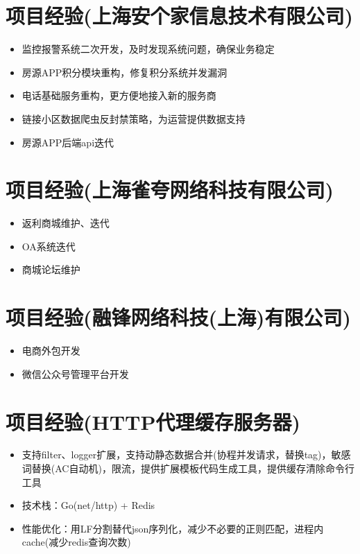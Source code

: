 \documentclass[a4paper,12pt]{article}
\begin{document}
\begin{CJK}{UTF8}{gbsn}
		\section{项目经验(上海安个家信息技术有限公司)}
			\begin{itemize}
				\item{监控报警系统二次开发，及时发现系统问题，确保业务稳定}
				\item{房源APP积分模块重构，修复积分系统并发漏洞}
				\item{电话基础服务重构，更方便地接入新的服务商}
				\item{链接小区数据爬虫反封禁策略，为运营提供数据支持}
				\item{房源APP后端api迭代}
			\end{itemize}
		
		\section{项目经验(上海雀夸网络科技有限公司)}
			\begin{itemize}
				\item{返利商城维护、迭代}
				\item{OA系统迭代}
				\item{商城论坛维护}
			\end{itemize}
			
		\section{项目经验(融锋网络科技(上海)有限公司)}
			\begin{itemize}
				\item{电商外包开发}
				\item{微信公众号管理平台开发}
			\end{itemize}
			
		\section{项目经验(HTTP代理缓存服务器)}
			\begin{itemize}
				\item{支持filter、logger扩展，支持动静态数据合并(协程并发请求，替换tag)，敏感词替换(AC自动机)，限流，提供扩展模板代码生成工具，提供缓存清除命令行工具}
				\item{技术栈：Go(net/http) + Redis}
				\item{性能优化：用LF分割替代json序列化，减少不必要的正则匹配，进程内cache(减少redis查询次数)}
			\end{itemize}
			

\end{CJK}
\end{document}
